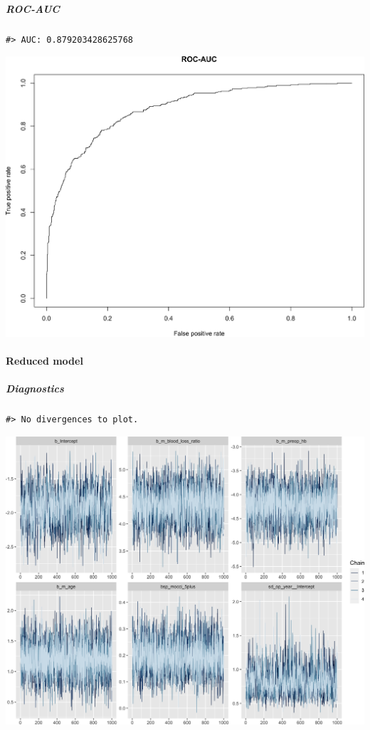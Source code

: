 \documentclass[
]{article}
\begin{document}
\hypertarget{roc-auc}{%
\subparagraph{ROC-AUC}\label{roc-auc}}

\begin{verbatim}
#> AUC: 0.879203428625768
\end{verbatim}

\begin{center}\includegraphics[width=1\linewidth]{notebook_files/figure-latex/model1full_rocauc-1} \end{center}

\hypertarget{reduced-model}{%
\paragraph{Reduced model}\label{reduced-model}}

\hypertarget{diagnostics-1}{%
\subparagraph{Diagnostics}\label{diagnostics-1}}

\begin{verbatim}
#> No divergences to plot.
\end{verbatim}

\begin{center}\includegraphics[width=1\linewidth]{notebook_files/figure-latex/model1reduced_diagnostics-1} \end{center}
\end{document}
